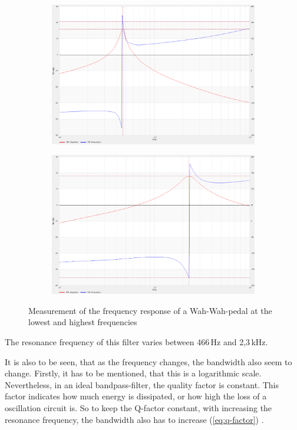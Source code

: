 \begin{figure}[!h]
    \centering
    \begin{subfigure}[c]{0.45\textwidth}
        \centering
        \includegraphics[width=\textwidth]{img/wahwah-1.png}
    \end{subfigure}
    \begin{subfigure}[c]{0.45\textwidth}
        \centering
        \includegraphics[width=\textwidth]{img/wahwah-2.png}
    \end{subfigure}
    \caption{Measurement of the frequency response of a Wah-Wah-pedal at the lowest and highest frequencies}
    \label{fig:wahwah-filter}
\end{figure}

The resonance frequency of this filter varies between 466\,Hz and 2,3\,kHz.

It is also to be seen, that as the frequency changes, the bandwidth also seem to change. Firstly, it has to be mentioned,
that this is a logarithmic scale. Nevertheless, in an ideal bandpass-filter, the quality factor is constant. This factor indicates
how much energy is dissipated, or how high the loss of a oscillation circuit is. So to keep the Q-factor constant, with
increasing the resonance frequency, the bandwidth also has to increase (\autoref{eq:q-factor}) \cite{taschenbuch_et}.

